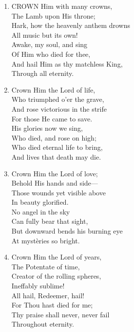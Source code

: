 \documentclass[11pt,a4paper]{article}
\begin{document}
\begin{enumerate}
    \item CROWN Him with many crowns, \\
        The Lamb upon His throne; \\
        Hark, how the heavenly anthem drowns \\
        All music but its own! \\
        Awake, my soul, and sing \\
        Of Him who died for thee, \\
        And hail Him as thy matchless King, \\
        Through all eternity.

    \item Crown Him the Lord of life, \\
        Who triumphed o'er the grave, \\
        And rose victorious in the strife \\
        For those He came to save. \\
        His glories now we sing, \\
        Who died, and rose on high; \\
        Who died eternal life to bring, \\
        And lives that death may die.

    \item Crown Him the Lord of love; \\
        Behold His hands and side--- \\
        Those wounds yet visible above \\
        In beauty glorified. \\
        No angel in the sky \\
        Can fully bear that sight, \\
        But downward bends his burning eye \\
        At myst\`eries so bright.

    \item Crown Him the Lord of years, \\
        The Potentate of time, \\
        Creator of the rolling spheres, \\
        Ineffably sublime! \\
        All hail, Redeemer, hail! \\
        For Thou hast died for me; \\
        Thy praise shall never, never fail \\
        Throughout eternity.

\end{enumerate}
\end{document}
